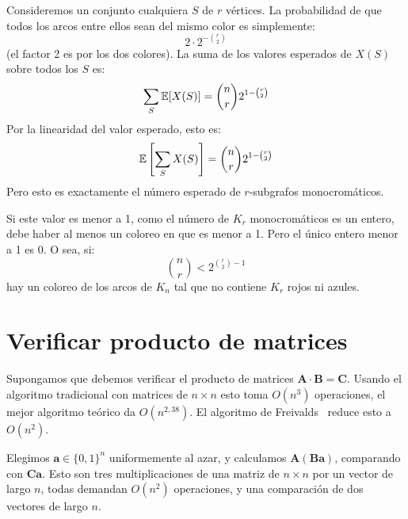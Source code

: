   Consideremos un conjunto cualquiera \(S\) de \(r\) vértices.
  La probabilidad de que todos los arcos entre ellos
  sean del mismo color es simplemente:
  \begin{equation*}
    2 \cdot 2^{- \binom{r}{2}}
  \end{equation*}
  (el factor \num{2} es por los dos colores).
  La suma de los valores esperados de \(X(S)\) sobre todos los \(S\) es:
  \begin{equation*}
    \sum_S \operatorname{\mathbb{E}}[X(S)]
      = \binom{n}{r} 2^{1 - \binom{r}{2}}
  \end{equation*}
  Por la linearidad del valor esperado,
  esto es:
  \begin{equation*}
    \operatorname{\mathbb{E}}\left[ \sum_S X(S) \right]
      = \binom{n}{r} 2^{1 - \binom{r}{2}}
  \end{equation*}
  Pero esto es exactamente
  el número esperado de \(r\)\nobreakdash-subgrafos monocromáticos.

  Si este valor es menor a \num{1},
  como el número de \(K_r\) monocromáticos es un entero,
  debe haber al menos un coloreo en que es menor a \num{1}.
  Pero el único entero menor a \num{1} es \num{0}.
  O sea,
  si:
  \begin{equation*}
    \binom{n}{r}
      < 2^{\binom{r}{2} - 1}
  \end{equation*}
  hay un coloreo de los arcos de \(K_n\)
  tal que no contiene \(K_r\) rojos ni azules.

\section{Verificar producto de matrices}
\label{sec:verificar-producto-matrices}

  Supongamos que debemos verificar el producto de matrices
  \(\mathbf{A} \cdot \mathbf{B} = \mathbf{C}\).
  Usando el algoritmo tradicional con matrices de \(n \times n\)
  esto toma \(O(n^3)\) operaciones,
  el mejor algoritmo teórico da \(O(n^{2,38})\).
  El algoritmo de Freivalds~%
    \cite{freivalds77:_matrix_product_check}
  reduce esto a \(O(n^2)\).

  Elegimos \(\mathbf{a} \in \{0, 1\}^n\) uniformemente al azar,
  y calculamos \(\mathbf{A} ( \mathbf{B} \mathbf{a} )\),
  comparando con \(\mathbf{C} \mathbf{a}\).
  Esto son tres multiplicaciones de una matriz de \(n \times n\)
  por un vector de largo \(n\),
  todas demandan \(O(n^2)\) operaciones,
  y una comparación de dos vectores de largo \(n\).

